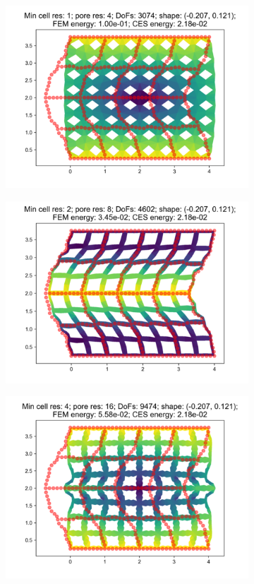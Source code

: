 \begin{figure}[H]
\begin{subfigure}{.45\textwidth}
  \centering
  \includegraphics[width=.8\linewidth]{lces/vis_compression/bm_3_mesh_0.png}
\end{subfigure}
\begin{subfigure}{.45\textwidth}
  \centering
  \includegraphics[width=.8\linewidth]{lces/vis_compression/bm_3_mesh_1.png}
\end{subfigure}
\newline
\begin{subfigure}{.45\textwidth}
  \centering
  \includegraphics[width=.8\linewidth]{lces/vis_compression/bm_3_mesh_2.png}

\end{subfigure}
\end{figure}
